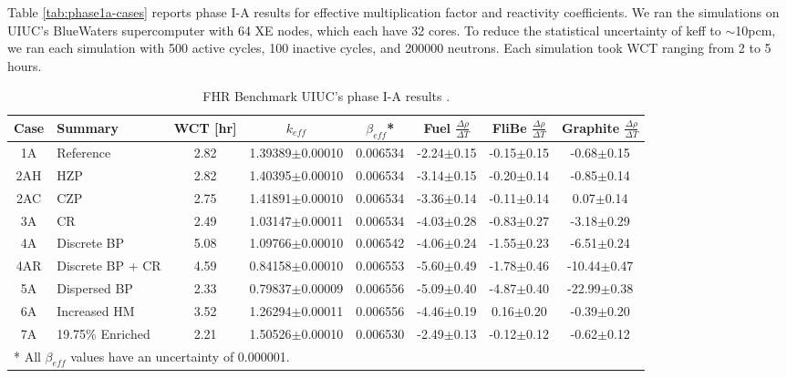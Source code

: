 Table \ref{tab:phase1a-cases} reports phase I-A results for effective multiplication 
factor and reactivity coefficients. 
We ran the simulations on \gls{UIUC}'s BlueWaters supercomputer \cite{ncsa_about_2017}
with 64 XE nodes, which each have 32 cores. 
To reduce the statistical uncertainty of keff to $\sim$10pcm, we ran each simulation 
with 500 active cycles, 100 inactive cycles, and 200000 neutrons. 
Each simulation took \gls{WCT} ranging from 2 to 5 hours. 
\begin{table}[H]
    \centering
    \onehalfspacing
    \caption{\gls{FHR} Benchmark UIUC's phase I-A results \cite{chee_arfcfhr-benchmark_2021}.}
	\label{tab:phase1a-results}
    \footnotesize
    \begin{tabular}{cp{2.7cm}cccccc}
    \hline
    \textbf{Case} & \textbf{Summary} & \textbf{WCT [hr]} & \textbf{$k_{eff}$} & 
    \textbf{$\beta_{eff}$}* & 
    \textbf{Fuel} $\frac{\Delta \rho}{\Delta T}$ & 
    \textbf{FliBe} $\frac{\Delta \rho}{\Delta T}$ & 
    \textbf{Graphite} $\frac{\Delta \rho}{\Delta T}$\\
    \hline 
    1A & Reference &2.82&1.39389$\pm$0.00010 & 0.006534 & -2.24$\pm$0.15 & -0.15$\pm$0.15 & -0.68$\pm$0.15\\
    2AH & \gls{HZP} &2.82&1.40395$\pm$0.00010 & 0.006534 & -3.14$\pm$0.15 & -0.20$\pm$0.14 & -0.85$\pm$0.14\\
    2AC & \gls{CZP} &2.75&1.41891$\pm$0.00010 & 0.006534 & -3.36$\pm$0.14 & -0.11$\pm$0.14 & 0.07$\pm$0.14\\
    3A & \gls{CR} &2.49&1.03147$\pm$0.00011 & 0.006534 & -4.03$\pm$0.28 & -0.83$\pm$0.27 & -3.18$\pm$0.29\\
    4A & Discrete \gls{BP} &5.08&1.09766$\pm$0.00010 & 0.006542 & -4.06$\pm$0.24 & -1.55$\pm$0.23 & -6.51$\pm$0.24\\
    4AR & Discrete \gls{BP} + \gls{CR} &4.59&0.84158$\pm$0.00010 & 0.006553 & -5.60$\pm$0.49 & -1.78$\pm$0.46 & -10.44$\pm$0.47\\
    5A & Dispersed \gls{BP} &2.33&0.79837$\pm$0.00009 & 0.006556 & -5.09$\pm$0.40 & -4.87$\pm$0.40 & -22.99$\pm$0.38\\
    6A & Increased \gls{HM} &3.52&1.26294$\pm$0.00011 & 0.006556 & -4.46$\pm$0.19 & 0.16$\pm$0.20 & -0.39$\pm$0.20\\
    7A & 19.75\% Enriched &2.21&1.50526$\pm$0.00010 & 0.006530 & -2.49$\pm$0.13 & -0.12$\pm$0.12 & -0.62$\pm$0.12\\
    \hline
    \multicolumn{5}{l}{* All $\beta_{eff}$ values have an uncertainty of 0.000001.} 
    \end{tabular}
\end{table}

